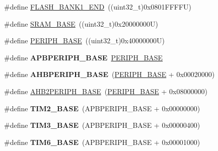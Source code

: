 \begin{DoxyCompactItemize}
\item 
\#define \hyperlink{group___peripheral__memory__map_ga443a2786535d83e32dfdc2b29e379332}{F\+L\+A\+S\+H\+\_\+\+B\+A\+N\+K1\+\_\+\+E\+ND}~((uint32\+\_\+t)0x0801\+F\+F\+F\+F\+U)
\item 
\#define \hyperlink{group___peripheral__memory__map_ga05e8f3d2e5868754a7cd88614955aecc}{S\+R\+A\+M\+\_\+\+B\+A\+SE}~((uint32\+\_\+t)0x20000000\+U)
\item 
\#define \hyperlink{group___peripheral__memory__map_ga9171f49478fa86d932f89e78e73b88b0}{P\+E\+R\+I\+P\+H\+\_\+\+B\+A\+SE}~((uint32\+\_\+t)0x40000000\+U)
\item 
\mbox{\label{group___peripheral__memory__map_gac85f31889eb6a3f651b563bbc7131f91}} 
\#define {\bfseries A\+P\+B\+P\+E\+R\+I\+P\+H\+\_\+\+B\+A\+SE}~\hyperlink{group___peripheral__memory__map_ga9171f49478fa86d932f89e78e73b88b0}{P\+E\+R\+I\+P\+H\+\_\+\+B\+A\+SE}
\item 
\mbox{\label{group___peripheral__memory__map_ga92eb5d49730765d2abd0f5b09548f9f5}} 
\#define {\bfseries A\+H\+B\+P\+E\+R\+I\+P\+H\+\_\+\+B\+A\+SE}~(\hyperlink{group___peripheral__memory__map_ga9171f49478fa86d932f89e78e73b88b0}{P\+E\+R\+I\+P\+H\+\_\+\+B\+A\+SE} + 0x00020000)
\item 
\#define \hyperlink{group___peripheral__memory__map_gaeedaa71d22a1948492365e2cd26cfd46}{A\+H\+B2\+P\+E\+R\+I\+P\+H\+\_\+\+B\+A\+SE}~(\hyperlink{group___peripheral__memory__map_ga9171f49478fa86d932f89e78e73b88b0}{P\+E\+R\+I\+P\+H\+\_\+\+B\+A\+SE} + 0x08000000)
\item 
\mbox{\label{group___peripheral__memory__map_ga00d0fe6ad532ab32f0f81cafca8d3aa5}} 
\#define {\bfseries T\+I\+M2\+\_\+\+B\+A\+SE}~(A\+P\+B\+P\+E\+R\+I\+P\+H\+\_\+\+B\+A\+SE + 0x00000000)
\item 
\mbox{\label{group___peripheral__memory__map_gaf0c34a518f87e1e505cd2332e989564a}} 
\#define {\bfseries T\+I\+M3\+\_\+\+B\+A\+SE}~(A\+P\+B\+P\+E\+R\+I\+P\+H\+\_\+\+B\+A\+SE + 0x00000400)
\item 
\mbox{\label{group___peripheral__memory__map_ga8268ec947929f192559f28c6bf7d1eac}} 
\#define {\bfseries T\+I\+M6\+\_\+\+B\+A\+SE}~(A\+P\+B\+P\+E\+R\+I\+P\+H\+\_\+\+B\+A\+SE + 0x00001000)

\end{DoxyCompactItemize}
